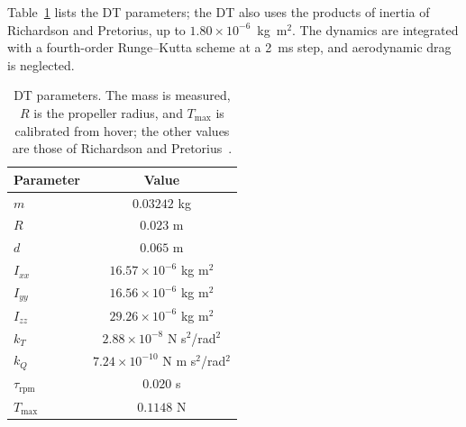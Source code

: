 \documentclass[journal]{IEEEtran}
\begin{document}
Table~\ref{tab:dt_parameters} lists the DT parameters; the DT also uses the products of inertia of Richardson and Pretorius, up to $1.80\times10^{-6}$~kg~m$^2$. The dynamics are integrated with a fourth-order Runge--Kutta scheme at a 2~ms step, and aerodynamic drag is neglected.
\begin{table}[t]
\centering
\caption{DT parameters. The mass is measured, $R$ is the propeller radius, and $T_{\max}$ is calibrated from hover; the other values are those of Richardson and Pretorius~\cite{Richardson2025}.}
\label{tab:dt_parameters}
\begin{tabular}{lc}
\hline
Parameter & Value \\
\hline
$m$ & $0.03242$ kg\\
$R$ & $0.023$ m \\
$d$ & $0.065$ m \\
$I_{xx}$ & $16.57\times10^{-6}$ kg m$^2$ \\
$I_{yy}$ & $16.56\times10^{-6}$ kg m$^2$ \\
$I_{zz}$ & $29.26\times10^{-6}$ kg m$^2$ \\
$k_T$ & $2.88\times10^{-8}$ N s$^2$/rad$^2$ \\
$k_Q$ & $7.24\times10^{-10}$ N m s$^2$/rad$^2$ \\
$\tau_{\mathrm{rpm}}$ & $0.020$ s \\
$T_{\max}$ & $0.1148$ N \\
\hline
\end{tabular}
\end{table}
\end{document}
